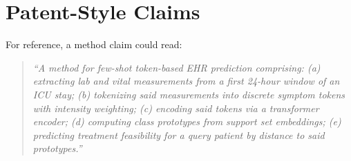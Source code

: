 \section{Patent-Style Claims}

For reference, a method claim could read:

\begin{quote}
\emph{``A method for few-shot token-based EHR prediction comprising: (a) extracting lab and vital measurements from a first 24-hour window of an ICU stay; (b) tokenizing said measurements into discrete symptom tokens with intensity weighting; (c) encoding said tokens via a transformer encoder; (d) computing class prototypes from support set embeddings; (e) predicting treatment feasibility for a query patient by distance to said prototypes.''}
\end{quote}
